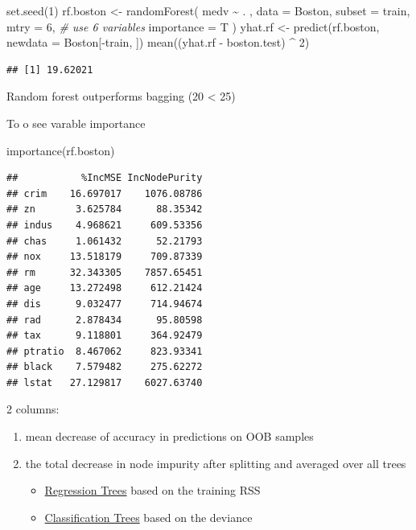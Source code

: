 \documentclass[
]{book}
\newenvironment{Shaded}{\begin{snugshade}}{\end{snugshade}}
\newcommand{\AttributeTok}[1]{\textcolor[rgb]{0.77,0.63,0.00}{#1}}
\newcommand{\CommentTok}[1]{\textcolor[rgb]{0.56,0.35,0.01}{\textit{#1}}}
\newcommand{\DecValTok}[1]{\textcolor[rgb]{0.00,0.00,0.81}{#1}}
\newcommand{\FunctionTok}[1]{\textcolor[rgb]{0.00,0.00,0.00}{#1}}
\newcommand{\NormalTok}[1]{#1}
\newcommand{\OtherTok}[1]{\textcolor[rgb]{0.56,0.35,0.01}{#1}}
\newcommand{\SpecialCharTok}[1]{\textcolor[rgb]{0.00,0.00,0.00}{#1}}
\begin{document}
\begin{Shaded}
\begin{Highlighting}[]
\FunctionTok{set.seed}\NormalTok{(}\DecValTok{1}\NormalTok{)}
\NormalTok{rf.boston }\OtherTok{\textless{}{-}}
    \FunctionTok{randomForest}\NormalTok{(}
\NormalTok{        medv }\SpecialCharTok{\textasciitilde{}}\NormalTok{ . ,}
        \AttributeTok{data =}\NormalTok{ Boston,}
        \AttributeTok{subset =}\NormalTok{ train,}
        \AttributeTok{mtry =} \DecValTok{6}\NormalTok{,}
        \CommentTok{\# use 6 variables}
        \AttributeTok{importance =}\NormalTok{ T}
\NormalTok{    )}
\NormalTok{yhat.rf }\OtherTok{\textless{}{-}} \FunctionTok{predict}\NormalTok{(rf.boston, }\AttributeTok{newdata =}\NormalTok{ Boston[}\SpecialCharTok{{-}}\NormalTok{train, ])}
\FunctionTok{mean}\NormalTok{((yhat.rf }\SpecialCharTok{{-}}\NormalTok{ boston.test) }\SpecialCharTok{\^{}} \DecValTok{2}\NormalTok{)}
\end{Highlighting}
\end{Shaded}

\begin{verbatim}
## [1] 19.62021
\end{verbatim}

Random forest outperforms bagging (20 \textless{} 25)

To o see varable importance

\begin{Shaded}
\begin{Highlighting}[]
\FunctionTok{importance}\NormalTok{(rf.boston)}
\end{Highlighting}
\end{Shaded}

\begin{verbatim}
##           %IncMSE IncNodePurity
## crim    16.697017    1076.08786
## zn       3.625784      88.35342
## indus    4.968621     609.53356
## chas     1.061432      52.21793
## nox     13.518179     709.87339
## rm      32.343305    7857.65451
## age     13.272498     612.21424
## dis      9.032477     714.94674
## rad      2.878434      95.80598
## tax      9.118801     364.92479
## ptratio  8.467062     823.93341
## black    7.579482     275.62272
## lstat   27.129817    6027.63740
\end{verbatim}

2 columns:

\begin{enumerate}
\def\labelenumi{\arabic{enumi}.}
\item
  mean decrease of accuracy in predictions on OOB samples
\item
  the total decrease in node impurity after splitting and averaged over all trees

  \begin{itemize}
  \item
    \protect\hyperlink{regression-trees}{Regression Trees} based on the training RSS
  \item
    \protect\hyperlink{classification-trees}{Classification Trees} based on the deviance
  \end{itemize}
\end{enumerate}
\end{document}
